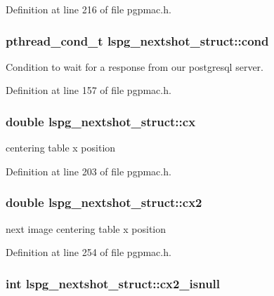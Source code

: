 Definition at line 216 of file pgpmac.h.\hypertarget{structlspg__nextshot__struct_afc773a9eefc173aa98d5c2889e1d7669}{
\subsubsection[{cond}]{\setlength{\rightskip}{0pt plus 5cm}pthread\_\-cond\_\-t {\bf lspg\_\-nextshot\_\-struct::cond}}}
\label{structlspg__nextshot__struct_afc773a9eefc173aa98d5c2889e1d7669}


Condition to wait for a response from our postgresql server. 

Definition at line 157 of file pgpmac.h.\hypertarget{structlspg__nextshot__struct_ad9eb2013fa6f295f72f0891fe98c863f}{
\subsubsection[{cx}]{\setlength{\rightskip}{0pt plus 5cm}double {\bf lspg\_\-nextshot\_\-struct::cx}}}
\label{structlspg__nextshot__struct_ad9eb2013fa6f295f72f0891fe98c863f}


centering table x position 

Definition at line 203 of file pgpmac.h.\hypertarget{structlspg__nextshot__struct_a10d45763100bc59f9a5f68f1b48db6d3}{
\subsubsection[{cx2}]{\setlength{\rightskip}{0pt plus 5cm}double {\bf lspg\_\-nextshot\_\-struct::cx2}}}
\label{structlspg__nextshot__struct_a10d45763100bc59f9a5f68f1b48db6d3}


next image centering table x position 

Definition at line 254 of file pgpmac.h.\hypertarget{structlspg__nextshot__struct_a3ad947f4efe2cb5c338244b019334749}{
\subsubsection[{cx2\_\-isnull}]{\setlength{\rightskip}{0pt plus 5cm}int {\bf lspg\_\-nextshot\_\-struct::cx2\_\-isnull}}}
\label{structlspg__nextshot__struct_a3ad947f4efe2cb5c338244b019334749}



